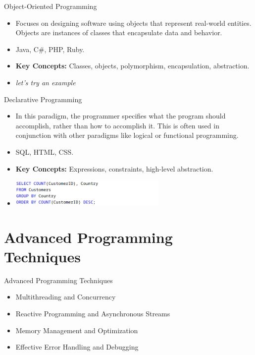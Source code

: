 \documentclass{beamer}
\begin{document}
\begin{frame}{Object-Oriented Programming}
	\scriptsize
	\begin{itemize}
		\item<1-> Focuses on designing software using objects that represent real-world entities. Objects are instances of classes that encapsulate data and behavior.
		\item<2-> Java, C\#, PHP, Ruby.
		\item<3-> \textbf{Key Concepts:}  Classes, objects, polymorphism, encapsulation, abstraction.
		\item<4-> \textit{let's try an example}
	\end{itemize}
\end{frame}

\begin{frame}[t]{Declarative Programming}
	\scriptsize
	\begin{itemize}
		\item<1-> In this paradigm, the programmer specifies what the program should accomplish, rather than how to accomplish it. This is often used in conjunction with other paradigms like logical or functional programming.
		\item<2-> SQL, HTML, CSS.
		\item<3-> \textbf{Key Concepts:} Expressions, constraints, high-level abstraction.
		\item<4->[]
			\begin{center}
				\includegraphics[width=0.6\textwidth, height=0.2\textheight]{img/sql-example.png}
			\end{center}
	\end{itemize}
\end{frame}

\section{Advanced Programming Techniques}
\begin{frame}{Advanced Programming Techniques}
	\scriptsize
	\begin{itemize}
		\item<1-> Multithreading and Concurrency
		\item<2-> Reactive Programming and Asynchronous Streams
		\item<3-> Memory Management and Optimization
		\item<4-> Effective Error Handling and Debugging
	\end{itemize}
	\begin{center}
	\end{center}
\end{frame}
\end{document}
